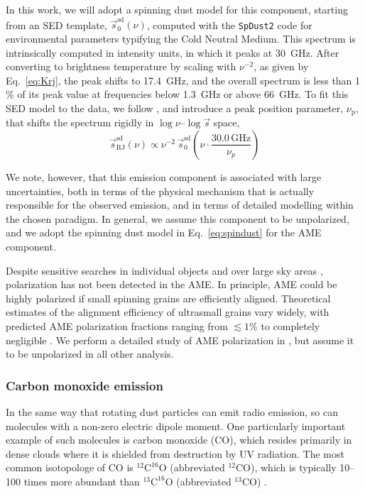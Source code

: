 \documentclass[twocolumn]{aa}
\newcommand{\s}[0]{\vec{s}}
\begin{document}
In this work, we will adopt a spinning dust model for this component,
starting from an SED template, $\s^{\mathrm{sd}}_0(\nu)$, computed
with the \texttt{SpDust2} code \citep{ali-haimoud:2009,
  ali-haimoud:2010, silsbee:2011} for environmental parameters typifying
the Cold Neutral Medium. This
spectrum is intrinsically computed in intensity units, in which it
peaks at 30~GHz. After converting to brightness temperature by scaling
with $\nu^{-2}$, as given by Eq.~\eqref{eq:Krj}, the peak shifts to
17.4~GHz, and the overall spectrum is less than 1\,\% of its peak
value at frequencies below 1.3~GHz or above 66~GHz. To fit this SED
model to the data, we follow \citet{bennett2012}, and introduce a peak
position parameter, $\nu_{\mathrm{p}}$, that shifts the spectrum
rigidly in $\log\nu$--$\log\s$ space,
\begin{equation}
\s^{\mathrm{sd}}_{\mathrm{RJ}}(\nu) \propto
\nu^{-2}\,\s^{\mathrm{sd}}_0\left(\nu \cdot
\frac{30.0\,\mathrm{GHz}}{\nu_p}\right)
\label{eq:spindust}
\end{equation}

We note, however, that this emission component is associated with
large uncertainties, both in terms of the physical mechanism that is
actually responsible for the observed emission, and in terms of
detailed modelling within the chosen paradigm. In general, we assume
this component to be unpolarized, and we adopt the spinning dust model
in Eq.~\eqref{eq:spindust} for the AME component.

Despite sensitive searches in individual objects \citep{QUIJOTE_I_2015, QUIJOTE_II_2016}
and over large sky areas \citep{macellari2011},
polarization has not been detected in the AME. In principle, AME could be highly polarized if
small spinning grains are efficiently aligned. Theoretical estimates of the alignment efficiency
of ultrasmall grains vary widely, with predicted AME polarization fractions ranging 
from $\lesssim 1\%$ \citep{hoang2013} to 
completely negligible \citep{draine2016}. We perform a detailed study of AME
polarization in \citet{bp15}, but assume it to be unpolarized in all other analysis.

\subsubsection{Carbon monoxide emission}
\label{sec:co}

In the same way that rotating dust particles can emit radio emission,
so can molecules with a non-zero electric dipole moment. One
particularly important example of such molecules is carbon monoxide
(CO), which resides primarily in dense clouds where it is shielded from
destruction by UV radiation. The most common isotopologe of CO is
$^{12}\mathrm{C}^{16}\mathrm{O}$ (abbreviated $^{12}\mathrm{CO}$),
which is typically 10--100 times more abundant than
$^{13}\mathrm{C}^{16}\mathrm{O}$ (abbreviated $^{13}\mathrm{CO}$)
\citep{szucs:2014}.
\end{document}
